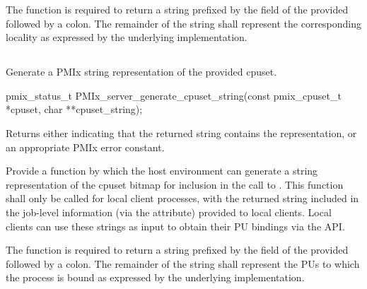 The function is required to return a string prefixed by the  field of the provided  followed by a colon. The remainder of the string shall represent the corresponding locality as expressed by the underlying implementation.

\subsection{}

\summary

Generate a \ac{PMIx} string representation of the provided cpuset.

\format

\cspecificstart
\begin{codepar}
pmix_status_t
PMIx_server_generate_cpuset_string(const pmix_cpuset_t *cpuset,
                                   char **cpuset_string);
\end{codepar}
\cspecificend

\begin{arglist}
\end{arglist}

Returns either  indicating that the returned string contains the representation, or an appropriate \ac{PMIx} error constant.


\descr

Provide a function by which the host environment can generate a string representation of the cpuset bitmap for inclusion in the call to . This function shall only be called for local client processes, with the returned string included in the job-level information (via the  attribute) provided to local clients. Local clients can use these strings as input to obtain their \ac{PU} bindings via the  \ac{API}.

The function is required to return a string prefixed by the  field of the provided  followed by a colon. The remainder of the string shall represent the \acp{PU} to which the process is bound as expressed by the underlying implementation.

